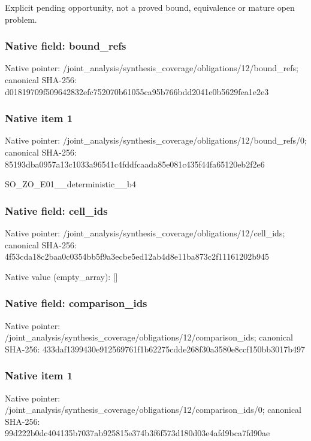 \documentclass[10pt,a4paper]{article}
\begin{document}
\begingroup\raggedright\sloppy Explicit pending opportunity,\allowbreak{} not a proved bound,\allowbreak{} equivalence or mature open problem.\par\endgroup

\subsubsection{Native field: bound\_\allowbreak{}refs}
Native pointer: /joint\_\allowbreak{}analysis/synthesis\_\allowbreak{}coverage/obligations/12/bound\_\allowbreak{}refs; canonical SHA-256: d01819709f509642832efc752070b61055ca95b766bdd2041e0b5629fea1e2e3

\subsubsection{Native item 1}
Native pointer: /joint\_\allowbreak{}analysis/synthesis\_\allowbreak{}coverage/obligations/12/bound\_\allowbreak{}refs/0; canonical SHA-256: 85193dba0957a13c1033a96541c4fddfcaada85e081c435f44fa65120eb2f2e6

\begingroup\raggedright\sloppy SO\_\allowbreak{}ZO\_\allowbreak{}E01\_\allowbreak{}\_\allowbreak{}deterministic\_\allowbreak{}\_\allowbreak{}b4\par\endgroup

\subsubsection{Native field: cell\_\allowbreak{}ids}
Native pointer: /joint\_\allowbreak{}analysis/synthesis\_\allowbreak{}coverage/obligations/12/cell\_\allowbreak{}ids; canonical SHA-256: 4f53cda18c2baa0c0354bb5f9a3ecbe5ed12ab4d8e11ba873c2f11161202b945

Native value (empty\_\allowbreak{}array): []

\subsubsection{Native field: comparison\_\allowbreak{}ids}
Native pointer: /joint\_\allowbreak{}analysis/synthesis\_\allowbreak{}coverage/obligations/12/comparison\_\allowbreak{}ids; canonical SHA-256: 433daf1399430e912569761f1b62275cdde268f30a3580e8ccf150bb3017b497

\subsubsection{Native item 1}
Native pointer: /joint\_\allowbreak{}analysis/synthesis\_\allowbreak{}coverage/obligations/12/comparison\_\allowbreak{}ids/0; canonical SHA-256: 99d222b0dc404135b7037ab925815e374b3f6f573d180d03e4afd9bca7fd90ae
\end{document}
